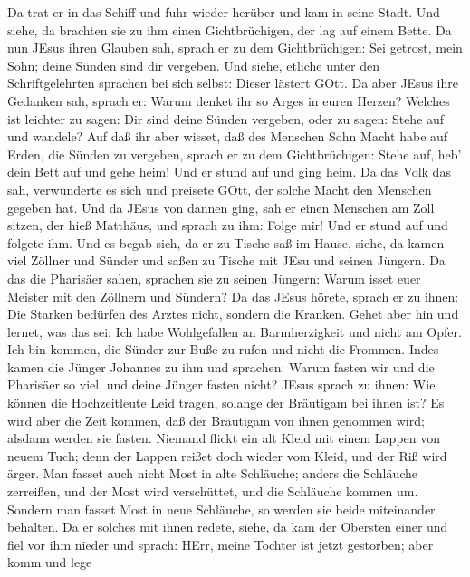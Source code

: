  Da trat er in das Schiff und fuhr wieder herüber und kam in
seine Stadt.  Und siehe, da brachten sie zu ihm einen
Gichtbrüchigen, der lag auf einem Bette. Da nun JEsus ihren Glauben sah,
sprach er zu dem Gichtbrüchigen: Sei getrost, mein Sohn; deine Sünden
sind dir vergeben.  Und siehe, etliche unter den
Schriftgelehrten sprachen bei sich selbst: Dieser lästert GOtt.
 Da aber JEsus ihre Gedanken sah, sprach er: Warum denket
ihr so Arges in euren Herzen?  Welches ist leichter zu
sagen: Dir sind deine Sünden vergeben, oder zu sagen: Stehe auf und
wandele?  Auf daß ihr aber wisset, daß des Menschen Sohn
Macht habe auf Erden, die Sünden zu vergeben, sprach er zu dem
Gichtbrüchigen: Stehe auf, heb' dein Bett auf und gehe heim!
 Und er stund auf und ging heim.  Da das Volk
das sah, verwunderte es sich und preisete GOtt, der solche Macht den
Menschen gegeben hat.  Und da JEsus von dannen ging, sah er
einen Menschen am Zoll sitzen, der hieß Matthäus, und sprach zu ihm:
Folge mir! Und er stund auf und folgete ihm.  Und es begab
sich, da er zu Tische saß im Hause, siehe, da kamen viel Zöllner und
Sünder und saßen zu Tische mit JEsu und seinen Jüngern.  Da
das die Pharisäer sahen, sprachen sie zu seinen Jüngern: Warum isset
euer Meister mit den Zöllnern und Sündern?  Da das JEsus
hörete, sprach er zu ihnen: Die Starken bedürfen des Arztes nicht,
sondern die Kranken.  Gehet aber hin und lernet, was das
sei: Ich habe Wohlgefallen an Barmherzigkeit und nicht am Opfer. Ich bin
kommen, die Sünder zur Buße zu rufen und nicht die Frommen.
 Indes kamen die Jünger Johannes zu ihm und sprachen: Warum
fasten wir und die Pharisäer so viel, und deine Jünger fasten nicht?
 JEsus sprach zu ihnen: Wie können die Hochzeitleute Leid
tragen, solange der Bräutigam bei ihnen ist? Es wird aber die Zeit
kommen, daß der Bräutigam von ihnen genommen wird; alsdann werden sie
fasten.  Niemand flickt ein alt Kleid mit einem Lappen von
neuem Tuch; denn der Lappen reißet doch wieder vom Kleid, und der Riß
wird ärger.  Man fasset auch nicht Most in alte Schläuche;
anders die Schläuche zerreißen, und der Most wird verschüttet, und die
Schläuche kommen um. Sondern man fasset Most in neue Schläuche, so
werden sie beide miteinander behalten.  Da er solches mit
ihnen redete, siehe, da kam der Obersten einer und fiel vor ihm nieder
und sprach: HErr, meine Tochter ist jetzt gestorben; aber komm und lege
